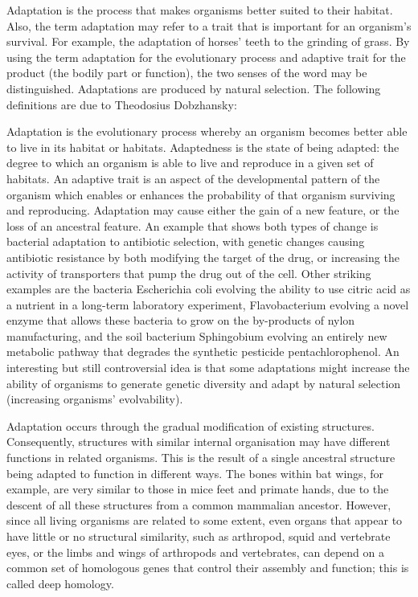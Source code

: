 Adaptation is the process that makes organisms better suited to their habitat. Also, the term adaptation may refer to a trait that is important for an organism's survival. For example, the adaptation of horses' teeth to the grinding of grass. By using the term adaptation for the evolutionary process and adaptive trait for the product (the bodily part or function), the two senses of the word may be distinguished. Adaptations are produced by natural selection. The following definitions are due to Theodosius Dobzhansky:

Adaptation is the evolutionary process whereby an organism becomes better able to live in its habitat or habitats.
Adaptedness is the state of being adapted: the degree to which an organism is able to live and reproduce in a given set of habitats.
An adaptive trait is an aspect of the developmental pattern of the organism which enables or enhances the probability of that organism surviving and reproducing.
Adaptation may cause either the gain of a new feature, or the loss of an ancestral feature. An example that shows both types of change is bacterial adaptation to antibiotic selection, with genetic changes causing antibiotic resistance by both modifying the target of the drug, or increasing the activity of transporters that pump the drug out of the cell. Other striking examples are the bacteria Escherichia coli evolving the ability to use citric acid as a nutrient in a long-term laboratory experiment, Flavobacterium evolving a novel enzyme that allows these bacteria to grow on the by-products of nylon manufacturing, and the soil bacterium Sphingobium evolving an entirely new metabolic pathway that degrades the synthetic pesticide pentachlorophenol. An interesting but still controversial idea is that some adaptations might increase the ability of organisms to generate genetic diversity and adapt by natural selection (increasing organisms' evolvability).

Adaptation occurs through the gradual modification of existing structures. Consequently, structures with similar internal organisation may have different functions in related organisms. This is the result of a single ancestral structure being adapted to function in different ways. The bones within bat wings, for example, are very similar to those in mice feet and primate hands, due to the descent of all these structures from a common mammalian ancestor. However, since all living organisms are related to some extent, even organs that appear to have little or no structural similarity, such as arthropod, squid and vertebrate eyes, or the limbs and wings of arthropods and vertebrates, can depend on a common set of homologous genes that control their assembly and function; this is called deep homology.



